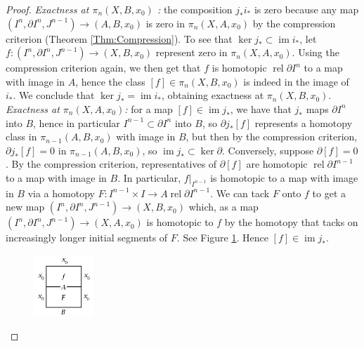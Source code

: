 \documentclass[reqno]{amsart}
\theoremstyle{definition}
\theoremstyle{remark}
\DeclareMathOperator{\im}{im}
\DeclareMathOperator{\rel}{rel}
\begin{document}
  \begin{proof}
      \textit{Exactness at $\pi_n
      \left( X,B,x_0 \right) $ :} the composition
      $j_* i_*$ is zero because any
      map $\left( I^{n}, \partial I^{n},
      J^{n-1}\right) \to \left( A,B,x_0 \right) $ 
      is zero in $\pi_n \left( X, A, x_0 \right) $ by the
      compression criterion (Theorem \ref{Thm:Compression}).
      To see that $\ker j_* \subset 
      \im i_*$, let
      $f \colon \left( I^{n}, \partial I^{n},
      J^{n-1}\right) \to \left( X, B, x_0 \right) $ 
      represent zero in $\pi_n \left( X, A, x_0 \right) $.
      Using the compression criterion again, we
      then get that $f$ is homotopic $\rel \partial I^{n}$ 
      to a map with image in $A$, hence the class
      $\left[ f \right] \in \pi_n \left( X, B, x_0 \right) $ 
      is indeed in the image of $i_*$. We conclude that
      $\ker j_* = \im i_*$, obtaining exactness
      at $\pi_n \left( X,B, x_0 \right) $.\\
      \textit{Exactness at $\pi_n (X,A,x_0)$:} 
      for a map  $\left[ f \right] 
      \in \im j_*$, we have that
      $j_*$ maps $\partial I^{n}$ into $B$, hence
      in particular $I^{n-1} \subset \partial I^{n}$ into
      $B$, so $\partial j_* \left[ f \right] $ 
      represents a homotopy class
      in $\pi_{n-1}\left( A,B,x_0 \right) $ with
      image in $B$, but then by the compression criterion,
      $\partial j_* \left[ f \right] = 0$ in
      $\pi_{n-1} \left( A,B,x_0 \right) $, so
      $\im j_* \subset \ker \partial $.
      Conversely, suppose
      $\partial \left[ f \right] = 0$. By the compression
      criterion, representatives of $\partial \left[ f \right] $
      are homotopic $\rel \partial I^{n-1}$ to a map
      with image in $B$. In particular,
      $f|_{I^{n-1}}$ is homotopic to a map with
      image in $B$ via a homotopy $F \colon
      I^{n-1} \times I \to A \rel \partial I^{n-1}$.
      We can tack $F$ onto $f$ to get a new map
      $\left( I^{n}, \partial I^{n},
      J^{n-1}\right) \to 
      \left( X, B, x_0 \right) $ which, as
      a map
      $\left( I^{n}, \partial I^{n}, J^{n-1} \right) \to 
      \left( X, A, x_0 \right) $ is homotopic to
      $f$ by the homotopy that tacks on increasingly longer
      initial segments of $F$. See Figure
      \ref{fig:IDIWKAKX-png}. Hence
      $\left[ f \right] \in \im j_*$.

      \begin{figure}[htpb]
          \centering
          \includegraphics[width=0.2\textwidth]{IDIWKAKX.png}
          \caption{}
          \label{fig:IDIWKAKX-png}
      \end{figure}


\end{proof}
\end{document}
